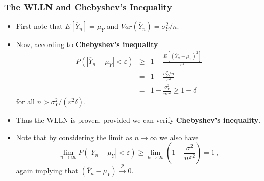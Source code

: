 \documentclass[notes=show,smaller,handout]{beamer}
\renewcommand{\Pr}{P}
\newenvironment{stepitemize}{\begin{itemize}[<+->]}{\end{itemize} }
\begin{document}
\begin{frame}%

\frametitle{The WLLN and Chebyshev's Inequality}

\begin{stepitemize}
\item First note that $E[\overline{Y}_n]=\mu_Y$ and $Var(\overline{Y}_n)=\sigma_Y^2/n$.
\item Now, according to \textbf{Chebyshev's inequality}
\begin{eqnarray*}
\Pr \left( |\overline{Y}_{n}-\mu_Y| <\varepsilon\right)  &\geq &1-\frac{E\left[ \left(
\overline{Y}_{n}-\mu_Y \right) ^{2}\right] }{\varepsilon^{2}} \\
&=&1-\frac{\sigma_Y ^{2}/n}{\varepsilon^{2}} \\
&=&1-\frac{\sigma_Y ^{2}}{n\varepsilon^{2}}\geq 1-\delta
\end{eqnarray*}
for all $n>\sigma_Y^2/(\varepsilon^2\delta)$.
\item Thus the WLLN is proven, provided we can verify \textbf{Chebyshev's inequality}.
\item Note that by considering the limit as $n\rightarrow \infty $ we also have%
\begin{equation*}
\lim_{n\rightarrow \infty }\Pr \left( \left\vert \overline{Y}_{n}-\mu_Y\right\vert <\varepsilon\right) \geq \lim_{n\rightarrow \infty }\left( 1-\frac{\sigma^{2}}{n\varepsilon^{2}}\right) =1\,,
\end{equation*}
again implying that $\left( \overline{Y}_{n}-\mu_Y \right) \overset{p}{\rightarrow }0$.
\end{stepitemize}

\end{frame}%
\end{document}
